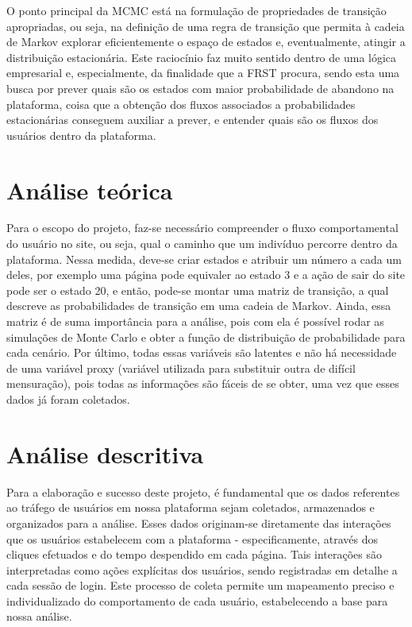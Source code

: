O ponto principal da MCMC está na formulação de propriedades de transição apropriadas, ou seja, na definição de uma regra de transição que permita à cadeia de Markov explorar eficientemente o espaço de estados e, eventualmente, atingir a distribuição estacionária. Este raciocínio faz muito sentido dentro de uma lógica empresarial e, especialmente, da finalidade que a FRST procura, sendo esta uma busca por prever quais são os estados com maior probabilidade de abandono na plataforma, coisa que a obtenção dos fluxos associados a probabilidades estacionárias conseguem auxiliar a prever, e entender quais são os fluxos dos usuários dentro da plataforma.

\section{Análise teórica}

Para o escopo do projeto, faz-se necessário compreender o fluxo comportamental do usuário no site, ou seja, qual o caminho que um indivíduo percorre dentro da plataforma. Nessa medida, deve-se criar estados e atribuir um número a cada um deles, por exemplo uma página pode equivaler ao estado 3 e a ação de sair do site pode ser o estado 20, e então, pode-se montar uma matriz de transição, a qual descreve as probabilidades de transição em uma cadeia de Markov. Ainda, essa matriz é de suma importância para a análise, pois com ela é possível rodar as simulações de Monte Carlo e obter a função de distribuição de probabilidade para cada cenário. Por último, todas essas variáveis são latentes e não há necessidade de uma variável proxy (variável utilizada para substituir outra de difícil mensuração), pois todas as informações são fáceis de se obter, uma vez que esses dados já foram coletados. 

\section{Análise descritiva}

Para a elaboração e sucesso deste projeto, é fundamental que os dados referentes ao tráfego de usuários em nossa plataforma sejam coletados, armazenados e organizados para a análise. Esses dados originam-se diretamente das interações que os usuários estabelecem com a plataforma - especificamente, através dos cliques efetuados e do tempo despendido em cada página. Tais interações são interpretadas como ações explícitas dos usuários, sendo registradas em detalhe a cada sessão de login. Este processo de coleta permite um mapeamento preciso e individualizado do comportamento de cada usuário, estabelecendo a base para nossa análise.

